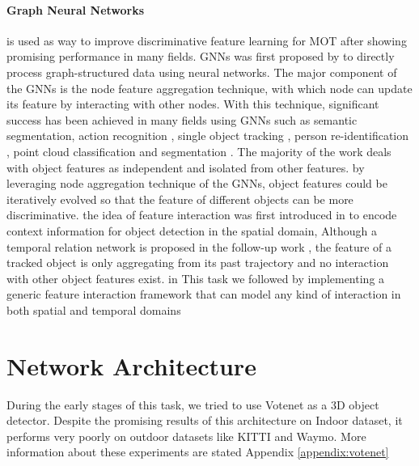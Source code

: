 \documentclass[10pt,twocolumn,letterpaper]{article}
\begin{document}
\paragraph{Graph Neural Networks} is used as way to improve discriminative feature learning for MOT after showing promising performance in many fields\cite{hamilton2017inductive,velivckovic2017graph,kipf2016semi, berg2017graph, monti2017geometric, ying2018graph}. GNNs was first proposed by \cite{gori2005new} to directly process graph-structured data using neural networks. The major component of the GNNs is the node feature aggregation technique, with which node can update its feature by interacting with other nodes. With this technique, significant success has been achieved in many fields using GNNs such as semantic segmentation\cite{chen2019graph}, action recognition \cite{shi2019skeleton}, single object tracking \cite{gao2019graph}, person re-identification \cite{wu2019unsupervised}, point cloud classification and segmentation \cite{wang2019dynamic}. The majority of the work deals with object features as independent and isolated from other features. by leveraging node aggregation technique of the GNNs, object features could be iteratively evolved so that the feature of different objects can be more discriminative. the idea of feature interaction was first introduced in \cite{hu2018relation} to encode context information for object detection in the spatial domain, Although a temporal relation network is proposed in the follow-up work \cite{xu2019spatial}, the feature of a tracked object is only aggregating from its past trajectory and no interaction with other object features exist. in This task we followed \cite{yin2020center} by implementing a generic feature interaction framework that can model any kind of interaction in both spatial and temporal domains




\section{Network Architecture}

During the early stages of this task, we tried to use Votenet \cite{qi2019deep} as a 3D object detector. Despite the promising results of this architecture on Indoor dataset, it performs very poorly on outdoor datasets like KITTI and Waymo. More information about these experiments are stated Appendix \ref{appendix:votenet}
\end{document}
